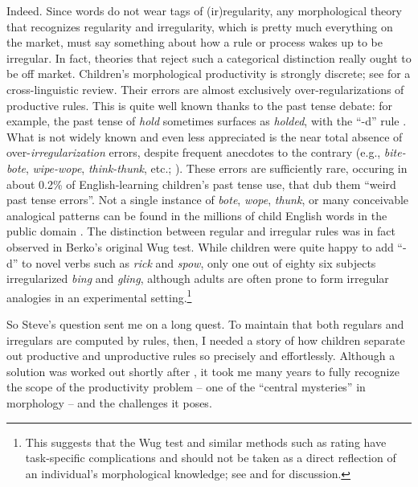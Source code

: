 \documentclass[output=paper,
modfonts
]{LSP/langsci}
\begin{document}
Indeed. Since words do not wear tags of (ir)regularity, any
morphological theory that recognizes regularity and irregularity,
which is pretty much everything on the
market, must say something about how a rule or process wakes up to be
irregular. In fact, 
theories that reject  such a categorical distinction
\citep[e.g.,][]{Hay2003, McClelland2002} really ought to be off
market. Children's morphological productivity is strongly discrete; see
\citealt[][Chapter 2]{POP}  for a cross-linguistic review. Their errors
are almost exclusively over-regularizations of productive rules. This
is quite well known thanks to the past tense debate: for example, the
past tense of \textit{hold}  sometimes surfaces as \textit{holded}, with the ``-d'' rule
\citep{Marcus1992}.   What is not widely known and even
less appreciated is the near total absence of over-\textit{irregularization} errors, despite frequent anecdotes to the
contrary (e.g., \textit{bite-bote}, \textit{wipe-wope}, \textit{think-thunk},
etc.; \citealt{Bowerman1982, Bybee1985, Pinker1999}). These errors
are sufficiently rare, occuring in  about 0.2\% of English-learning children's
past tense use,  that \citet{Xu1995} dub them ``weird past tense
errors''. Not  a single instance of \textit{bote},
\textit{wope}, \textit{thunk}, or many conceivable analogical patterns
can be found in the millions of child English words in the public
domain \citep{CHILDES}. The distinction between regular and irregular
rules was in fact observed in Berko's \citeyearpar{Berko1958} original Wug test. While  children 
were quite happy to add ``-d'' to novel verbs such as \textit{rick} and
\textit{spow}, only one out of eighty six subjects irregularized \textit{bing} and
\textit{gling}, although adults are often prone to form irregular
analogies in an experimental setting.\footnote{This suggests
  that the Wug test and similar methods such as rating have
 task-specific complications and should not be taken as a direct
 reflection of an   individual's morphological knowledge; see
 \citealt{Schutze2005} and \citealt{POP} for   discussion.}  

So  Steve's question sent me on
a long quest. To maintain that both regulars and irregulars are
computed by rules, 
then, I needed a story of how children separate out productive
and  unproductive rules so precisely and effortlessly.
Although a solution was worked 
out shortly after \citep{Yang2002}, it took me many years 
 to fully recognize the scope of the productivity problem -- one
of the ``central mysteries'' in morphology
\citep[][p35]{Aronoff1976} -- and the challenges it poses. 
\end{document}
